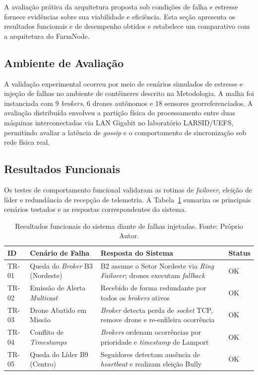 A avaliação prática da arquitetura proposta sob condições de falha e estresse fornece evidências sobre sua viabilidade e eficiência. Esta seção apresenta os resultados funcionais e de desempenho obtidos e estabelece um comparativo com a arquitetura do FarmNode.

\subsection{Ambiente de Avaliação}
\label{sub:ambiente_avaliacao}

A validação experimental ocorreu por meio de cenários simulados de estresse e injeção de falhas no ambiente de contêineres descrito na Metodologia. A malha foi instanciada com 9 \textit{brokers}, 6 drones autônomos e 18 sensores georreferenciados. A avaliação distribuída envolveu a partição física do processamento entre duas máquinas interconectadas via LAN Gigabit no laboratório LARSID/UEFS, permitindo avaliar a latência de \textit{gossip} e o comportamento de sincronização sob rede física real.

\subsection{Resultados Funcionais}
\label{sub:resultados_funcionais}

Os testes de comportamento funcional validaram as rotinas de \textit{failover}, eleição de líder e redundância de recepção de telemetria. A Tabela~\ref{tab:resiliencia} sumariza os principais cenários testados e as respostas correspondentes do sistema.

\begin{table}[ht]
  \centering
  \sloppy
  \caption{Resultados funcionais do sistema diante de falhas injetadas. Fonte: Próprio Autor.}
  \label{tab:resiliencia}
  \begin{tabular}{p{0.8cm}p{4.2cm}p{6.0cm}p{1.0cm}}
    \toprule
    \textbf{ID} & \textbf{Cenário de Falha} & \textbf{Resposta do Sistema} & \textbf{Status} \\
    \midrule
    TR-01 & Queda do \textit{Broker} B3 (Nordeste) & B2 assume o Setor Nordeste via \textit{Ring Failover}; drones executam \textit{fallback} & OK \\
    TR-02 & Emissão de Alerta \textit{Multicast} & Recebido de forma redundante por todos os \textit{brokers} ativos & OK \\
    TR-03 & Drone Abatido em Missão & \textit{Broker} detecta perda de \textit{socket} TCP, remove drone e re-enfileira ocorrência & OK \\
    TR-04 & Conflito de \textit{Timestamps} & \textit{Brokers} ordenam ocorrências por prioridade e \textit{timestamp} de Lamport & OK \\
    TR-05 & Queda do Líder B9 (Centro) & Seguidores detectam ausência de \textit{heartbeat} e realizam eleição Bully & OK \\
    \bottomrule
  \end{tabular}
\end{table}

